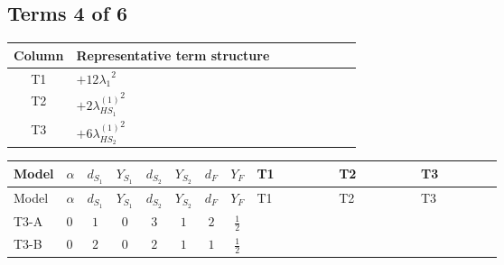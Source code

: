 \documentclass[8pt]{article}
\begin{document}
\begin{landscape}
\subsection*{Terms 4 of 6}
\begin{center}
\begin{tabular}{@{}c >{\raggedright\arraybackslash}p{0.82\linewidth}@{}}
\toprule
Column & Representative term structure \\
\midrule
T1 & \(\displaystyle +12 {\lambda_1}^2\) \\
\midrule
T2 & \(\displaystyle +2 {\lambda_{HS_1}^{(1)}}^2\) \\
\midrule
T3 & \(\displaystyle +6 {\lambda_{HS_2}^{(1)}}^2\) \\
\midrule
\bottomrule
\end{tabular}
\end{center}
\smallskip
\tiny
\begin{longtable}{@{}llcccccc >{\raggedright\arraybackslash}p{0.21\linewidth} >{\raggedright\arraybackslash}p{0.21\linewidth} >{\raggedright\arraybackslash}p{0.21\linewidth}@{}}
\toprule
Model & $\alpha$ & $d_{S_1}$ & $Y_{S_1}$ & $d_{S_2}$ & $Y_{S_2}$ & $d_F$ & $Y_F$ & T1 & T2 & T3 \\
\midrule
\endfirsthead
\toprule
Model & $\alpha$ & $d_{S_1}$ & $Y_{S_1}$ & $d_{S_2}$ & $Y_{S_2}$ & $d_F$ & $Y_F$ & T1 & T2 & T3 \\
\midrule
\endhead
T3-A & $0$ & $1$ & $0$ & $3$ & $1$ & $2$ & $\frac{1}{2}$ & \scriptsize\adjustbox{max width=\linewidth}{$\begin{gathered} +12 {\lambda_1}^2\end{gathered}$} & \scriptsize\adjustbox{max width=\linewidth}{$\begin{gathered} +2 {\lambda_{HS_1}^{(1)}}^2\end{gathered}$} & \scriptsize\adjustbox{max width=\linewidth}{$\begin{gathered} +6 {\lambda_{HS_2}^{(1)}}^2\end{gathered}$} \\
\midrule
T3-B & $0$ & $2$ & $0$ & $2$ & $1$ & $1$ & $\frac{1}{2}$ & \scriptsize\adjustbox{max width=\linewidth}{$\begin{gathered} +12 {\lambda_1}^2\end{gathered}$} & \scriptsize\adjustbox{max width=\linewidth}{$\begin{gathered} +4 {\lambda_{HS_1}^{(1)}}^2\end{gathered}$} & \scriptsize\adjustbox{max width=\linewidth}{$\begin{gathered} +4 {\lambda_{HS_2}^{(1)}}^2\end{gathered}$} \\

\end{longtable}
\end{landscape}
\end{document}
